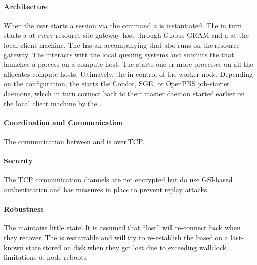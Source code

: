 \documentclass{sig-alternate}
\begin{document}
\paragraph{Architecture}

When the user starts a session via the  command a
 is instantiated. The  in turn
starts a  at every resource site gateway host through
Globus GRAM and a  at the local client machine.
The  has an accompanying  that
also runs on the resource gateway. The  interacts
with the local queuing systems and submits the  that
launches a  process on a compute host. The  starts one or more  processes on all the
allocates compute hosts. Ultimately, the  in
control of the worker node. Depending on the configuration, the  starts the Condor, SGE, or OpenPBS job-starter daemons, which in
turn connect back to their master daemon started earlier on the local client
machine by the .

\paragraph{Coordination and Communication}

The communication between  and 
is over TCP.

\paragraph{Security}

The TCP communication channels are not encrypted but do use GSI-based
authentication and has measures in place to prevent replay attacks.

\paragraph{Robustness}

The  maintains little state. It is assumed that ``lost''
 will re-connect back when they recover.
The  is restartable and will try to re-establish the
 based on a last-known state stored on disk when they got
lost due to exceeding wallclock limitations or node reboots;
\end{document}
